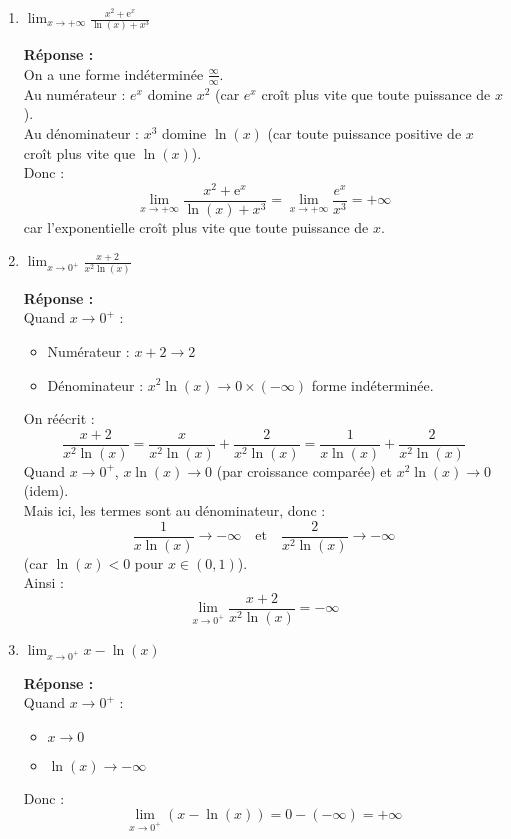 \begin{enumerate}
\item $\lim _{x \rightarrow+\infty} \frac{x^2+\mathrm{e}^x}{\ln (x)+x^3}$
  
  \textbf{Réponse :} \\
  On a une forme indéterminée $\frac{\infty}{\infty}$. \\
  Au numérateur : $e^x$ domine $x^2$ (car $e^x$ croît plus vite que toute puissance de $x$). \\
  Au dénominateur : $x^3$ domine $\ln(x)$ (car toute puissance positive de $x$ croît plus vite que $\ln(x)$). \\
  Donc :
  \[
  \lim _{x \rightarrow+\infty} \frac{x^2+\mathrm{e}^x}{\ln (x)+x^3} = \lim _{x \rightarrow+\infty} \frac{e^x}{x^3} = +\infty
  \]
  car l'exponentielle croît plus vite que toute puissance de $x$.

\item $\lim _{x \rightarrow 0^{+}} \frac{x+2}{x^2 \ln (x)}$
  
  \textbf{Réponse :} \\
  Quand $x \to 0^+$ :
  \begin{itemize}
  \item Numérateur : $x + 2 \to 2$
  \item Dénominateur : $x^2 \ln(x) \to 0 \times (-\infty)$ forme indéterminée.
  \end{itemize}
  On réécrit :
  \[
  \frac{x+2}{x^2 \ln(x)} = \frac{x}{x^2 \ln(x)} + \frac{2}{x^2 \ln(x)} = \frac{1}{x \ln(x)} + \frac{2}{x^2 \ln(x)}
  \]
  Quand $x \to 0^+$, $x \ln(x) \to 0$ (par croissance comparée) et $x^2 \ln(x) \to 0$ (idem). \\
  Mais ici, les termes sont au dénominateur, donc :
  \[
  \frac{1}{x \ln(x)} \to -\infty \quad \text{et} \quad \frac{2}{x^2 \ln(x)} \to -\infty
  \]
  (car $\ln(x) < 0$ pour $x \in (0,1)$). \\
  Ainsi :
  \[
  \lim _{x \rightarrow 0^{+}} \frac{x+2}{x^2 \ln (x)} = -\infty
  \]

\item $\lim _{x \rightarrow 0^{+}} x-\ln (x)$
  
  \textbf{Réponse :} \\
  Quand $x \to 0^+$ :
  \begin{itemize}
  \item $x \to 0$
  \item $\ln(x) \to -\infty$
  \end{itemize}
  Donc :
  \[
  \lim _{x \rightarrow 0^{+}} (x - \ln(x)) = 0 - (-\infty) = +\infty
  \]
\end{enumerate}

